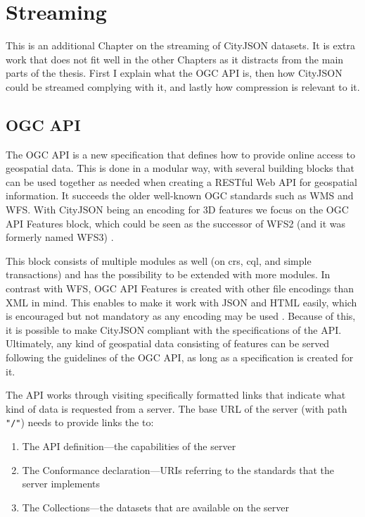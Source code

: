 \chapter{Streaming}
\label{ch:streaming}

This is an additional Chapter on the streaming of CityJSON datasets.
It is extra work that does not fit well in the other Chapters as it distracts from the main parts of the thesis.
First I explain what the OGC API is, then how CityJSON could be streamed complying with it, and lastly how compression is relevant to it.

\section{OGC API}
\label{sec:ogcapi}
The OGC API \citep{Consortium2020} is a new specification that defines how to provide online access to geospatial data.
This is done in a modular way, with several building blocks that can be used together as needed when creating a RESTful Web API for geospatial information.
It succeeds the older well-known OGC standards such as WMS and WFS.
With CityJSON being an encoding for 3D features we focus on the OGC API Features block, which could be seen as the successor of WFS2 (and it was formerly named WFS3) \citep{OGC2020, Consortium2020}.

This block consists of multiple modules as well (on \ac{crs}, \ac{cql}, and simple transactions) and has the possibility to be extended with more modules.
In contrast with WFS, OGC API Features is created with other file encodings than XML in mind.
This enables to make it work with JSON and HTML easily, which is encouraged but not mandatory as any encoding may be used \citep{Consortium2020, Consortium2019}.
Because of this, it is possible to make CityJSON compliant with the specifications of the API.
Ultimately, any kind of geospatial data consisting of features can be served following the guidelines of the OGC API, as long as a specification is created for it.

The API works through visiting specifically formatted links that indicate what kind of data is requested from a server.
The base URL of the server (with path \texttt{"/"}) needs to provide links the to:

\begin{enumerate}

\item The API definition---the capabilities of the server
\item The Conformance declaration---URIs referring to the standards that the server implements
\item The Collections---the datasets that are available on the server

\end{enumerate}

